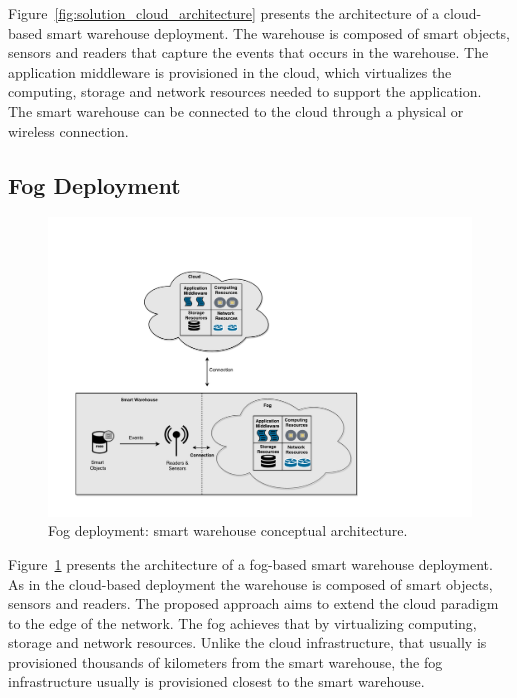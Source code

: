 Figure~\ref{fig:solution_cloud_architecture} presents the architecture of a cloud-based smart warehouse deployment.
The warehouse is composed of smart objects, sensors and readers that capture the events that occurs
in the warehouse. The application middleware is provisioned in the cloud, which virtualizes the computing,
storage and network resources needed to support the application.\\

The smart warehouse can be connected to the cloud through a physical or wireless connection.

\subsection{Fog Deployment}
\label{sub:sol_fog}

\begin{figure}[ht!]
\centering
\includegraphics[width=\textwidth]{./images/solution_fog_architecture}
\caption[Fog deployment: conceptual architecture.]{Fog deployment: smart warehouse conceptual architecture.}
\label{fig:solution_fog_architecture}
\end{figure}

Figure~\ref{fig:solution_fog_architecture} presents the architecture of a fog-based smart warehouse deployment.
As in the cloud-based deployment the warehouse is composed of smart objects, sensors and readers.
The proposed approach aims to extend the cloud paradigm to the edge of the network. The fog achieves
that by virtualizing computing, storage and network resources. Unlike the cloud infrastructure, that
usually is provisioned thousands of kilometers from the smart warehouse, the fog infrastructure
usually is provisioned closest to the smart warehouse.\\

